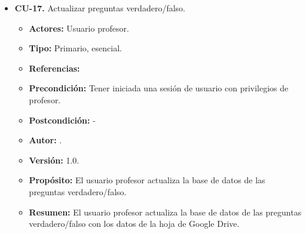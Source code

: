 \begin{itemize}
  \item \textbf{CU-17.} Actualizar preguntas verdadero/falso.
  \begin{itemize}
    \item \textbf{Actores:} Usuario profesor.
    \item \textbf{Tipo:} Primario, esencial.
    \item \textbf{Referencias:}
    \item \textbf{Precondición:} Tener iniciada una sesión de usuario con privilegios de profesor.
    \item \textbf{Postcondición:} - 
    \item \textbf{Autor:} \autor.
    \item \textbf{Versión:} 1.0.
    \item \textbf{Propósito:} El usuario profesor actualiza la base de datos de las preguntas verdadero/falso.
    \item \textbf{Resumen:} El usuario profesor actualiza la base de datos de las preguntas verdadero/falso con los datos de la hoja de Google Drive.


\end{itemize}
\end{itemize}
